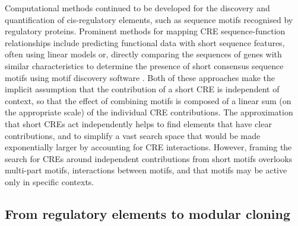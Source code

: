 \documentclass[../main.tex]{subfiles}
\begin{document}
Computational methods continued to be developed for the discovery and quantification of cis-regulatory elements, such as sequence motifs recognised by regulatory proteins.
Prominent methods for mapping CRE sequence-function relationships include predicting functional data with short sequence features, often using linear models \parencite{Shalgi2005,Cheng2017,Vijayabaskar2019} or, directly comparing the sequences of genes with similar characteristics to determine the presence of short
consensus sequence motifs \parencite{Hogan2008,Kretz2013} using motif discovery software \parencite{Elemento2007, Bailey2015}.
Both of these approaches make the implicit assumption that the contribution of a short CRE is independent of context, so that the effect of combining motifs is composed of a linear sum (on the appropriate scale) of the individual CRE contributions.
The approximation that short CREs act independently helps to find elements that have clear contributions, and to simplify a vast search space that would be made exponentially larger by accounting for CRE interactions. 
However, framing the search for CREs around independent contributions from short motifs overlooks multi-part motifs, interactions between motifs, and that motifs may be active only in specific contexts.

\subsection{From regulatory elements to modular cloning}
\end{document}

